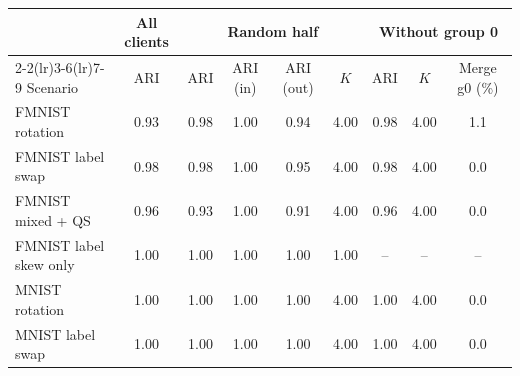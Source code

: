 \scriptsize
\setlength{\tabcolsep}{3pt}
\begin{tabular}{lcccccccc}
\toprule
 & All clients & \multicolumn{4}{c}{Random half} & \multicolumn{3}{c}{Without group 0} \\
\cmidrule(lr){2-2}\cmidrule(lr){3-6}\cmidrule(lr){7-9}
Scenario & ARI & ARI & ARI (in) & ARI (out) & $K$ & ARI & $K$ & Merge g0 (\%) \\
\midrule
FMNIST rotation & 0.93 & 0.98 & 1.00 & 0.94 & 4.00 & 0.98 & 4.00 & 1.1 \\
FMNIST label swap & 0.98 & 0.98 & 1.00 & 0.95 & 4.00 & 0.98 & 4.00 & 0.0 \\
FMNIST mixed + QS & 0.96 & 0.93 & 1.00 & 0.91 & 4.00 & 0.96 & 4.00 & 0.0 \\
FMNIST label skew only & 1.00 & 1.00 & 1.00 & 1.00 & 1.00 & -- & -- & -- \\
MNIST rotation & 1.00 & 1.00 & 1.00 & 1.00 & 4.00 & 1.00 & 4.00 & 0.0 \\
MNIST label swap & 1.00 & 1.00 & 1.00 & 1.00 & 4.00 & 1.00 & 4.00 & 0.0 \\
\bottomrule
\end{tabular}
